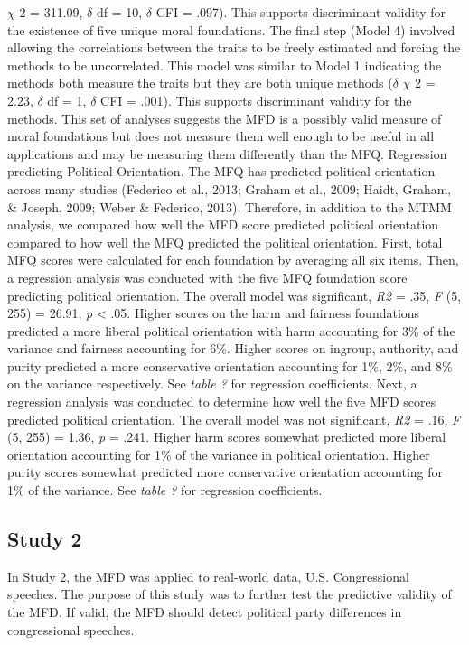 \documentclass[english,man]{apa6}
\theoremstyle{definition}
\theoremstyle{definition}
\theoremstyle{definition}
\theoremstyle{remark}
\begin{document}
\(\chi\) 2 = 311.09, \(\delta\) df = 10, \(\delta\) CFI = .097). This
supports discriminant validity for the existence of five unique moral
foundations. The final step (Model 4) involved allowing the correlations
between the traits to be freely estimated and forcing the methods to be
uncorrelated. This model was similar to Model 1 indicating the methods
both measure the traits but they are both unique methods (\(\delta\)
\(\chi\) 2 = 2.23, \(\delta\) df = 1, \(\delta\) CFI = .001). This
supports discriminant validity for the methods. This set of analyses
suggests the MFD is a possibly valid measure of moral foundations but
does not measure them well enough to be useful in all applications and
may be measuring them differently than the MFQ. Regression predicting
Political Orientation. The MFQ has predicted political orientation
across many studies (Federico et al., 2013; Graham et al., 2009; Haidt,
Graham, \& Joseph, 2009; Weber \& Federico, 2013). Therefore, in
addition to the MTMM analysis, we compared how well the MFD score
predicted political orientation compared to how well the MFQ predicted
the political orientation. First, total MFQ scores were calculated for
each foundation by averaging all six items. Then, a regression analysis
was conducted with the five MFQ foundation score predicting political
orientation. The overall model was significant, \emph{R2} = .35,
\emph{F} (5, 255) = 26.91, \emph{p} \textless{} .05. Higher scores on
the harm and fairness foundations predicted a more liberal political
orientation with harm accounting for 3\% of the variance and fairness
accounting for 6\%. Higher scores on ingroup, authority, and purity
predicted a more conservative orientation accounting for 1\%, 2\%, and
8\% on the variance respectively. See \emph{table ?} for regression
coefficients. Next, a regression analysis was conducted to determine how
well the five MFD scores predicted political orientation. The overall
model was not significant, \emph{R2} = .16, \emph{F} (5, 255) = 1.36,
\emph{p} = .241. Higher harm scores somewhat predicted more liberal
orientation accounting for 1\% of the variance in political orientation.
Higher purity scores somewhat predicted more conservative orientation
accounting for 1\% of the variance. See \emph{table ?} for regression
coefficients.

\subsection{Study 2}\label{study-2}

In Study 2, the MFD was applied to real-world data, U.S. Congressional
speeches. The purpose of this study was to further test the predictive
validity of the MFD. If valid, the MFD should detect political party
differences in congressional speeches.
\end{document}
